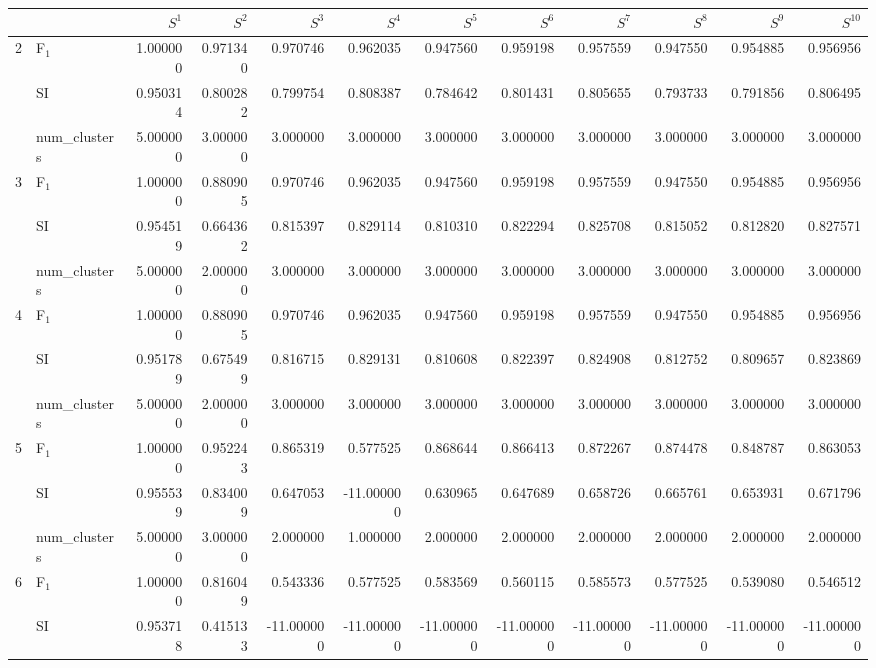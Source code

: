 \begin{tabular}{llrrrrrrrrrr}
\toprule
 &  & $S^{1}$ & $S^{2}$ & $S^{3}$ & $S^{4}$ & $S^{5}$ & $S^{6}$ & $S^{7}$ & $S^{8}$ & $S^{9}$ & $S^{10}$ \\
\midrule
\multirow[c]{3}{*}{2} & F$_1$ & 1.000000 & 0.971340 & 0.970746 & 0.962035 & 0.947560 & 0.959198 & 0.957559 & 0.947550 & 0.954885 & 0.956956 \\
 & SI & 0.950314 & 0.800282 & 0.799754 & 0.808387 & 0.784642 & 0.801431 & 0.805655 & 0.793733 & 0.791856 & 0.806495 \\
 & num_clusters & 5.000000 & 3.000000 & 3.000000 & 3.000000 & 3.000000 & 3.000000 & 3.000000 & 3.000000 & 3.000000 & 3.000000 \\
\multirow[c]{3}{*}{3} & F$_1$ & 1.000000 & 0.880905 & 0.970746 & 0.962035 & 0.947560 & 0.959198 & 0.957559 & 0.947550 & 0.954885 & 0.956956 \\
 & SI & 0.954519 & 0.664362 & 0.815397 & 0.829114 & 0.810310 & 0.822294 & 0.825708 & 0.815052 & 0.812820 & 0.827571 \\
 & num_clusters & 5.000000 & 2.000000 & 3.000000 & 3.000000 & 3.000000 & 3.000000 & 3.000000 & 3.000000 & 3.000000 & 3.000000 \\
\multirow[c]{3}{*}{4} & F$_1$ & 1.000000 & 0.880905 & 0.970746 & 0.962035 & 0.947560 & 0.959198 & 0.957559 & 0.947550 & 0.954885 & 0.956956 \\
 & SI & 0.951789 & 0.675499 & 0.816715 & 0.829131 & 0.810608 & 0.822397 & 0.824908 & 0.812752 & 0.809657 & 0.823869 \\
 & num_clusters & 5.000000 & 2.000000 & 3.000000 & 3.000000 & 3.000000 & 3.000000 & 3.000000 & 3.000000 & 3.000000 & 3.000000 \\
\multirow[c]{3}{*}{5} & F$_1$ & 1.000000 & 0.952243 & 0.865319 & 0.577525 & 0.868644 & 0.866413 & 0.872267 & 0.874478 & 0.848787 & 0.863053 \\
 & SI & 0.955539 & 0.834009 & 0.647053 & -11.000000 & 0.630965 & 0.647689 & 0.658726 & 0.665761 & 0.653931 & 0.671796 \\
 & num_clusters & 5.000000 & 3.000000 & 2.000000 & 1.000000 & 2.000000 & 2.000000 & 2.000000 & 2.000000 & 2.000000 & 2.000000 \\
\multirow[c]{3}{*}{6} & F$_1$ & 1.000000 & 0.816049 & 0.543336 & 0.577525 & 0.583569 & 0.560115 & 0.585573 & 0.577525 & 0.539080 & 0.546512 \\
 & SI & 0.953718 & 0.415133 & -11.000000 & -11.000000 & -11.000000 & -11.000000 & -11.000000 & -11.000000 & -11.000000 & -11.000000 \\

\end{tabular}
